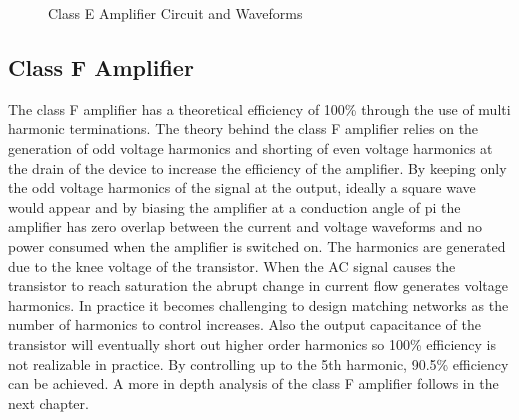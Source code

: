 \begin{figure}
    \caption{Class E Amplifier Circuit and Waveforms\cite{C.Cripps2006}}\label{fig:class_e}
\end{figure}

\subsection{Class F Amplifier}

The class F amplifier has a theoretical efficiency of 100\% through the use of multi harmonic terminations. The theory behind the class F amplifier relies on the generation of odd voltage harmonics and shorting of even voltage harmonics at the drain of the device to increase the efficiency of the amplifier. By keeping only the odd voltage harmonics of the signal at the output, ideally a square wave would appear and by biasing the amplifier at a conduction angle of pi the amplifier has zero overlap between the current and voltage waveforms and no power consumed when the amplifier is switched on.
The harmonics are generated due to the knee voltage of the transistor. When the AC signal causes the transistor to reach saturation the abrupt change in current flow generates voltage harmonics. In practice it becomes challenging to design matching networks as the number of harmonics to control increases. Also the output capacitance of the transistor will eventually short out higher order harmonics so 100\% efficiency is not realizable in practice. By controlling up to the 5th harmonic, 90.5\% efficiency can be achieved. A more in depth analysis of the class F amplifier follows in the next chapter.

%
%
%


